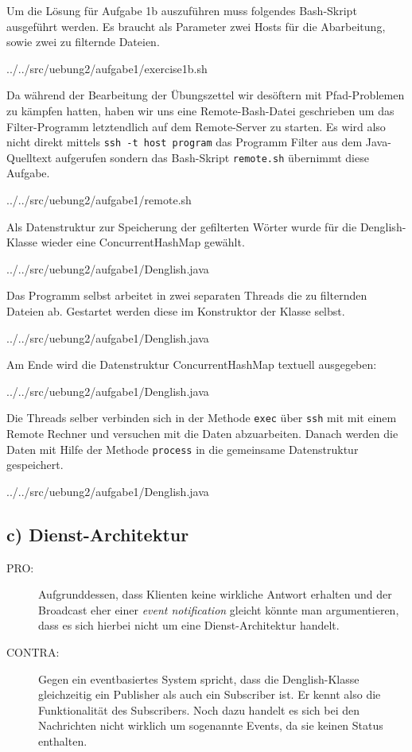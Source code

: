 	Um die Lösung für Aufgabe 1b auszuführen muss folgendes Bash-Skript ausgeführt werden.
	Es braucht als Parameter zwei Hosts für die Abarbeitung, sowie zwei zu filternde Dateien.
	
	{../../src/uebung2/aufgabe1/exercise1b.sh}

	Da während der Bearbeitung der Übungszettel wir desöftern mit Pfad-Problemen zu kämpfen hatten,
	haben wir uns eine Remote-Bash-Datei geschrieben um das Filter-Programm letztendlich auf dem Remote-Server zu starten.
	Es wird also nicht direkt mittels \texttt{ssh -t host program} das Programm Filter aus dem Java-Quelltext aufgerufen
	sondern das Bash-Skript \texttt{remote.sh} übernimmt diese Aufgabe. 
	
	{../../src/uebung2/aufgabe1/remote.sh}

	Als Datenstruktur zur Speicherung der gefilterten Wörter wurde für die Denglish-Klasse wieder eine ConcurrentHashMap gewählt.
	
	{../../src/uebung2/aufgabe1/Denglish.java}

	Das Programm selbst arbeitet in zwei separaten Threads die zu filternden Dateien ab.
	Gestartet werden diese im Konstruktor der Klasse selbst.
	
	{../../src/uebung2/aufgabe1/Denglish.java}

	Am Ende wird die Datenstruktur ConcurrentHashMap textuell ausgegeben:
	
	{../../src/uebung2/aufgabe1/Denglish.java}


	Die Threads selber verbinden sich in der Methode \texttt{exec}  über \texttt{ssh} mit mit einem Remote Rechner und versuchen mit die Daten abzuarbeiten.
	Danach werden die Daten mit Hilfe der Methode \texttt{process} in die gemeinsame Datenstruktur gespeichert.
	
	{../../src/uebung2/aufgabe1/Denglish.java}



	
\subsection*{c) Dienst-Architektur}
\begin{description}
\item[PRO:]
	Aufgrunddessen, dass Klienten keine wirkliche Antwort erhalten und der Broadcast eher einer \textit{event notification} gleicht könnte man argumentieren, dass es sich hierbei nicht um eine Dienst-Architektur handelt.

\item[CONTRA:]
	Gegen ein eventbasiertes System spricht, dass die Denglish-Klasse gleichzeitig ein Publisher als auch ein Subscriber ist.
	Er kennt also die Funktionalität des Subscribers. Noch dazu handelt es sich bei den Nachrichten nicht wirklich um sogenannte Events, da sie keinen Status enthalten.
\end{description}
